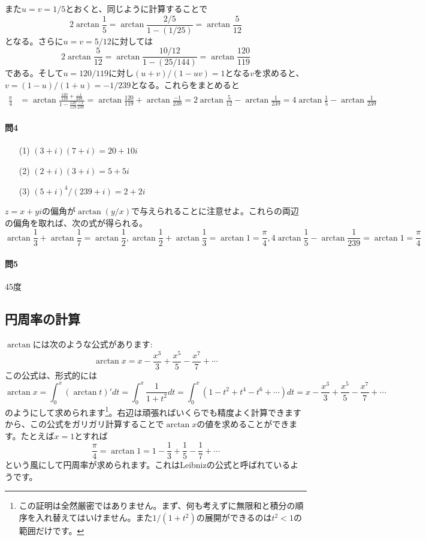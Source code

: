 また$u=v=1/5$とおくと、同じように計算することで
\[
2\arctan\frac{1}{5} = \arctan\frac{2/5}{1-(1/25)} = \arctan\frac{5}{12}
\]
となる。さらに$u=v=5/12$に対しては
\[
2\arctan\frac{5}{12} = \arctan\frac{10/12}{1-(25/144)} = \arctan\frac{120}{119}
\]
である。そして$u=120/119$に対し$(u+v)/(1-uv)=1$となる$v$を求めると、$v=(1-u)/(1+u)=-1/239$となる。これらをまとめると
\begin{align*}
\frac{\pi}{4}
&= \arctan \frac{\frac{120}{119}+\frac{-1}{239}}{1-\frac{120}{119}\frac{-1}{239}}
= \arctan \frac{120}{119} + \arctan\frac{-1}{239}
= 2\arctan\frac{5}{12} - \arctan\frac{1}{239}
= 4\arctan\frac{1}{5} - \arctan\frac{1}{239}
\end{align*}

\paragraph{問4}
\begin{enumerate}
\item[(1)] $(3+i)(7+i) = 20+10i$
\item[(2)] $(2+i)(3+i) = 5+5i$
\item[(3)] $(5+i)^4/(239+i) = 2+2i$
\end{enumerate}
$z=x+yi$の偏角が$\arctan (y/x)$で与えられることに注意せよ。これらの両辺の偏角を取れば、次の式が得られる。
\[
\arctan\frac{1}{3} + \arctan\frac{1}{7} = \arctan\frac{1}{2},
\arctan\frac{1}{2} + \arctan\frac{1}{3} = \arctan{1} = \frac{\pi}{4},
4\arctan\frac{1}{5} - \arctan\frac{1}{239} = \arctan{1} = \frac{\pi}{4}
\]

\paragraph{問5} 45度

\subsection{円周率の計算}

$\arctan$には次のような公式があります:
\[
\arctan x = x - \frac{x^3}{3} + \frac{x^5}{5} - \frac{x^7}{7} + \cdots
\]
この公式は、形式的には
\[
\arctan x = \int_0^x (\arctan t)' dt = \int_0^x \frac{1}{1+t^2} dt = \int_0^x (1-t^2+t^4-t^6+\cdots) dt
= x - \frac{x^3}{3} + \frac{x^5}{5} - \frac{x^7}{7} + \cdots
\]
のようにして求められます\footnote{この証明は全然厳密ではありません。まず、何も考えずに無限和と積分の順序を入れ替えてはいけません。また$1/(1+t^2)$の展開ができるのは$t^2<1$の範囲だけです。}。右辺は頑張ればいくらでも精度よく計算できますから、この公式をガリガリ計算することで$\arctan x$の値を求めることができます。たとえば$x=1$とすれば
\[
\frac{\pi}{4} = \arctan 1 = 1 - \frac{1}{3} + \frac{1}{5} - \frac{1}{7} + \cdots
\]
という風にして円周率が求められます。これはLeibnizの公式と呼ばれているようです。

